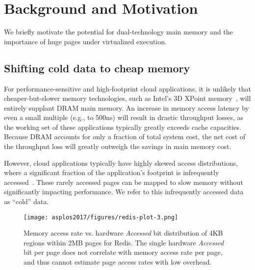 \section{Background and Motivation}
\label{motivation}

We briefly motivate the potential for dual-technology main memory and the importance of huge pages under virtualized execution.

%

\subsection{Shifting cold data to cheap memory}
\label{analytic-model}

For performance-sensitive and high-footprint cloud applications, it is unlikely that cheaper-but-slower
memory technologies, such as Intel's 3D XPoint memory~\cite{3dcrosspoint}, will 
entirely supplant DRAM main memory.
An increase in memory access latency by even a small multiple (e.g., to 500ns)
will result in drastic throughput losses, as the working set of these applications typically
greatly exceeds cache capacities.
Because DRAM accounts for only a fraction of total system cost, the net cost of the
throughput loss will greatly outweigh the savings in main memory cost.

However, cloud applications typically have highly skewed access distributions, where
a significant fraction of the application's footprint is infrequently
accessed~\cite{ycsb}.
These rarely accessed pages can be mapped to slow memory without significantly impacting performance.
We refer to this infrequently accessed data as ``cold'' data.

\begin{figure}[t]
\centering
\texttt{[image: asplos2017/figures/redis-plot-3.png]}
\caption{Memory access rate vs. hardware {\it Accessed} bit distribution of 4KB
regions within 2MB pages for Redis. The single hardware {\it Accessed} bit per page
does not correlate with memory access rate per page, and thus cannot
estimate page access rates with low overhead.}
\label{fig:redis-access-bit}
\end{figure}

